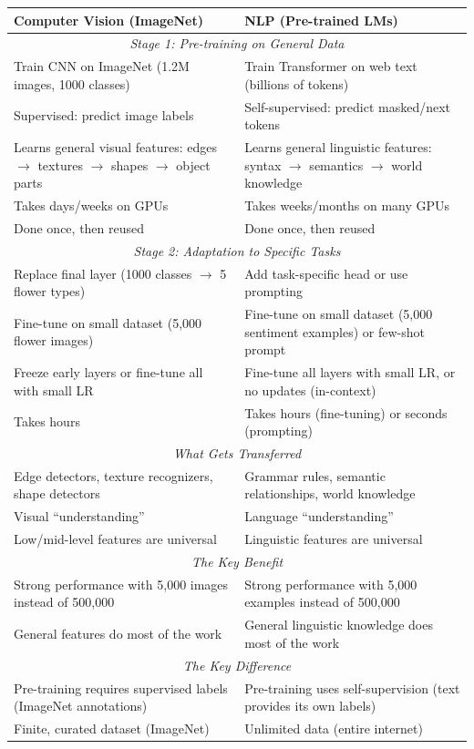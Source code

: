 \documentclass{article}
\begin{document}
\begin{center}
\begin{tabular}{p{5.5cm}p{5.5cm}}
\toprule
\textbf{Computer Vision (ImageNet)} & \textbf{NLP (Pre-trained LMs)} \\
\midrule
\multicolumn{2}{c}{\textit{Stage 1: Pre-training on General Data}} \\
\midrule
Train CNN on ImageNet (1.2M images, 1000 classes) & Train Transformer on web text (billions of tokens) \\
\midrule
Supervised: predict image labels & Self-supervised: predict masked/next tokens \\
\midrule
Learns general visual features: edges $\rightarrow$ textures $\rightarrow$ shapes $\rightarrow$ object parts & Learns general linguistic features: syntax $\rightarrow$ semantics $\rightarrow$ world knowledge \\
\midrule
Takes days/weeks on GPUs & Takes weeks/months on many GPUs \\
\midrule
Done once, then reused & Done once, then reused \\
\midrule
\multicolumn{2}{c}{\textit{Stage 2: Adaptation to Specific Tasks}} \\
\midrule
Replace final layer (1000 classes $\rightarrow$ 5 flower types) & Add task-specific head or use prompting \\
\midrule
Fine-tune on small dataset (5,000 flower images) & Fine-tune on small dataset (5,000 sentiment examples) or few-shot prompt \\
\midrule
Freeze early layers or fine-tune all with small LR & Fine-tune all layers with small LR, or no updates (in-context) \\
\midrule
Takes hours & Takes hours (fine-tuning) or seconds (prompting) \\
\midrule
\multicolumn{2}{c}{\textit{What Gets Transferred}} \\
\midrule
Edge detectors, texture recognizers, shape detectors & Grammar rules, semantic relationships, world knowledge \\
\midrule
Visual ``understanding'' & Language ``understanding'' \\
\midrule
Low/mid-level features are universal & Linguistic features are universal \\
\midrule
\multicolumn{2}{c}{\textit{The Key Benefit}} \\
\midrule
Strong performance with 5,000 images instead of 500,000 & Strong performance with 5,000 examples instead of 500,000 \\
\midrule
General features do most of the work & General linguistic knowledge does most of the work \\
\midrule
\multicolumn{2}{c}{\textit{The Key Difference}} \\
\midrule
Pre-training requires supervised labels (ImageNet annotations) & Pre-training uses self-supervision (text provides its own labels) \\
\midrule
Finite, curated dataset (ImageNet) & Unlimited data (entire internet) \\
\bottomrule
\end{tabular}
\end{center}
\end{document}
